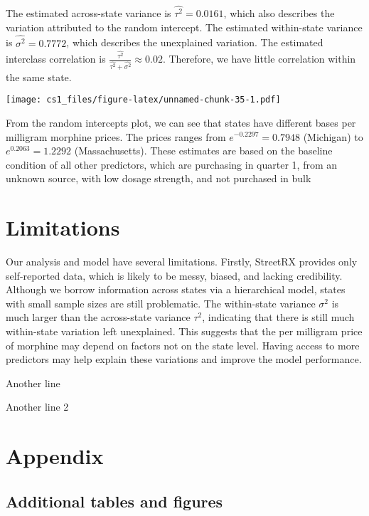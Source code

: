 \documentclass[
  11pt,
]{article}
\begin{document}
The estimated across-state variance is \(\hat{\tau^2} = 0.0161\), which
also describes the variation attributed to the random intercept. The
estimated within-state variance is \(\hat{\sigma^2} = 0.7772\), which
describes the unexplained variation. The estimated interclass
correlation is
\(\frac{\hat{\tau^2}}{\hat{\tau^2} + \hat{\sigma^2}} \approx 0.02\).
Therefore, we have little correlation within the same state.

\texttt{[image: cs1\_files/figure-latex/unnamed-chunk-35-1.pdf]}

From the random intercepts plot, we can see that states have different
bases per milligram morphine prices. The prices ranges from
\(e^{-0.2297} = 0.7948\) (Michigan) to \(e^{0.2063} = 1.2292\)
(Massachusetts). These estimates are based on the baseline condition of
all other predictors, which are purchasing in quarter 1, from an unknown
source, with low dosage strength, and not purchased in bulk

\hypertarget{limitations}{%
\section{Limitations}\label{limitations}}

Our analysis and model have several limitations. Firstly, StreetRX
provides only self-reported data, which is likely to be messy, biased,
and lacking credibility. Although we borrow information across states
via a hierarchical model, states with small sample sizes are still
problematic. The within-state variance \(\sigma^2\) is much larger than
the across-state variance \(\tau^2\), indicating that there is still
much within-state variation left unexplained. This suggests that the per
milligram price of morphine may depend on factors not on the state
level. Having access to more predictors may help explain these
variations and improve the model performance.

Another line

Another line 2

\newpage

\hypertarget{appendix}{%
\section{Appendix}\label{appendix}}

\hypertarget{additional-tables-and-figures}{%
\subsection{Additional tables and
figures}\label{additional-tables-and-figures}}
\end{document}
